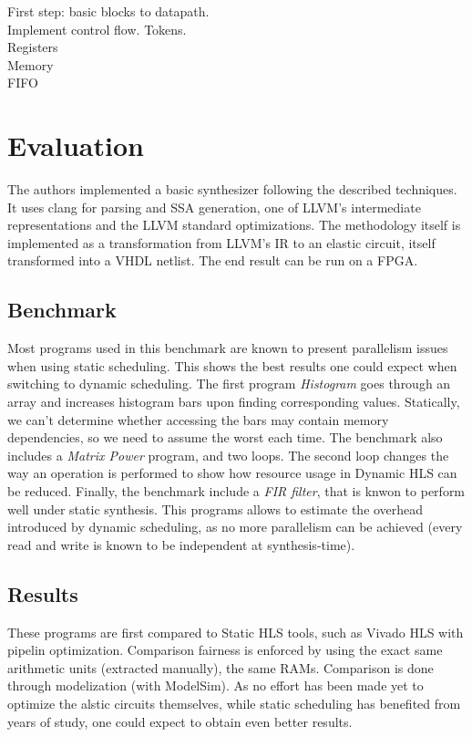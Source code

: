 \documentclass{article}
\begin{document}
First step: basic blocks to datapath.\\
Implement control flow. Tokens.\\
Registers\\
Memory\\
FIFO

\section{Evaluation}
The authors implemented a basic synthesizer following the described techniques.
It uses clang for parsing and SSA generation, one of LLVM's intermediate representations and the LLVM standard optimizations.
The methodology itself is implemented as a transformation from LLVM's IR to an elastic circuit, itself transformed into a VHDL netlist. The end result can be run on a FPGA.

\subsection{Benchmark}
Most programs used in this benchmark are known to present parallelism issues when using static scheduling. This shows the best results one could expect when switching to dynamic scheduling.
The first program \textit{Histogram} goes through an array and increases histogram bars upon finding corresponding values. Statically, we can't determine whether accessing the bars may contain memory dependencies, so we need to assume the worst each time.
The benchmark also includes a \textit{Matrix Power} program, and two loops. The second loop changes the way an operation is performed to show how resource usage in Dynamic HLS can be reduced.
Finally, the benchmark include a \textit{FIR filter}, that is knwon to perform well under static synthesis. This programs allows to estimate the overhead introduced by dynamic scheduling, as no more parallelism can be achieved (every read and write is known to be independent at synthesis-time).

\subsection{Results}
These programs are first compared to Static HLS tools, such as Vivado HLS with pipelin optimization. Comparison fairness is enforced by using the exact same arithmetic units (extracted manually), the same RAMs.
Comparison is done through modelization (with ModelSim).
As no effort has been made yet to optimize the alstic circuits themselves, while static scheduling has benefited from years of study, one could expect to obtain even better results.
\end{document}
